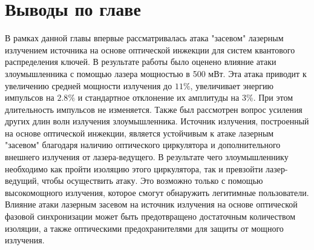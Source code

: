 \section{Выводы по главе}
В рамках данной главы впервые рассматривалась атака "засевом" лазерным излучением источника на основе оптической инжекции для систем квантового распределения ключей. В результате работы было оценено влияние атаки злоумышленника с помощью лазера мощностью в 500 мВт. 
Эта атака приводит к увеличению средней мощности излучения до $11\%$, увеличивает энергию импульсов на $2.8\%$ и стандартное отклонение их амплитуды на 3\%. При этом длительность импульсов не изменяется.
Также был рассмотрен вопрос усиления других длин волн излучения злоумышленника. Источник излучения, построенный на основе оптической инжекции, является устойчивым к атаке лазерным "засевом" благодаря наличию оптического циркулятора и дополнительного внешнего излучения от лазера-ведущего.
В результате чего злоумышленнику необходимо как пройти изоляцию этого циркулятора, так и превзойти лазер-ведущий, чтобы осуществить атаку. Это возможно только с помощью высокомощного излучения, которое смогут обнаружить легитимные пользователи.
\newline Влияние атаки лазерным засевом на источник излучения на основе оптической фазовой синхронизации может быть предотвращено достаточным количеством изоляции, а также оптическими предохранителями для защиты от мощного излучения.